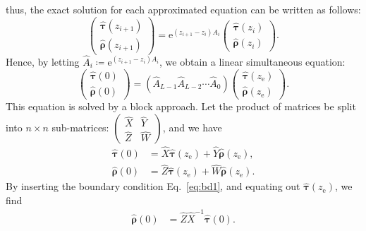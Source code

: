 \documentclass[preprint, 5p, times, sort&compress]{elsarticle}
\def\vtau{\bm{\tau}}
\def\vrho{\bm{\rho}}
\def\zbot{z_\text{e}}
\def\ee{\mathrm{e}}
\begin{document}
        thus, the exact solution for each approximated equation can be written as follows:
        \begin{equation}
                \begin{pmatrix}
                        \hat{\vtau}(z_{i+1}) \\
                        \hat{\vrho}(z_{i+1})
                \end{pmatrix}
                =
                \mathrm{e}^{(z_{i+1}-z_i)A_i}
                \begin{pmatrix}
                        \hat{\vtau}(z_{i}) \\
                        \hat{\vrho}(z_{i})
                \end{pmatrix}.
                \label{eq:ichimiya2}
        \end{equation}
        Hence, by letting $\hat{A}_i \coloneqq \ee^{(z_{i+1}-z_i)A_i}$, we obtain a linear simultaneous equation:
        \begin{equation}
                \begin{pmatrix}
                        \hat{\vtau}(0) \\
                        \hat{\vrho}(0)
                \end{pmatrix}
                =
                \left(\hat{A}_{L-1}\hat{A}_{L-2}\cdots\hat{A}_0\right)
                \begin{pmatrix}
                        \hat{\vtau}(\zbot) \\
                        \hat{\vrho}(\zbot)
                \end{pmatrix}.
                \label{eq:ichimiya3}
        \end{equation}
        This equation is solved by a block approach. Let the product of matrices be split into $n\times n$ sub-matrices:
        $\begin{pmatrix} \hat{X} & \hat{Y} \\
                \hat{Z} & \hat{W}\end{pmatrix}$,
        and we have
        \begin{align}
                \hat{\vtau}(0) &= \hat{X} \hat{\vtau}(\zbot) + \hat{Y}\hat{\vrho}(\zbot), \\
                \hat{\vrho}(0) &= \hat{Z} \hat{\vtau}(\zbot) + \hat{W}\hat{\vrho}(\zbot).
        \end{align}
        By inserting the boundary condition Eq.~\eqref{eq:bd1}, and equating out $\hat{\vtau}(\zbot)$, we find
        \begin{align}
                \hat{\vrho}(0) &= \hat{Z} \hat{X}^{-1} \hat{\vtau}(0).\label{eq:ichimiya4}
        \end{align}
\end{document}
